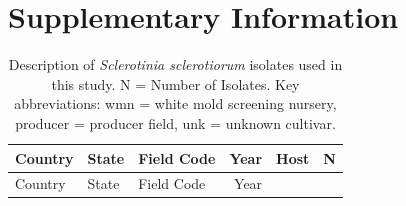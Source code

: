 \section*{Supplementary Information}\label{supplementary-information}

\setcounter{table}{0} \renewcommand{\thetable}{S\arabic{table}}
\setcounter{figure}{0} \renewcommand{\thefigure}{S\arabic{figure}}

\begin{longtable}[]{@{}lllrlr@{}}
\caption{\label{tab:isolate-table} Description of \emph{Sclerotinia
sclerotiorum} isolates used in this study. N = Number of Isolates. Key
abbreviations: wmn = white mold screening nursery, producer = producer
field, unk = unknown cultivar.}\tabularnewline
\toprule
\begin{minipage}[b]{0.11\columnwidth}\raggedright\strut
Country\strut
\end{minipage} & \begin{minipage}[b]{0.08\columnwidth}\raggedright\strut
State\strut
\end{minipage} & \begin{minipage}[b]{0.12\columnwidth}\raggedright\strut
Field Code\strut
\end{minipage} & \begin{minipage}[b]{0.19\columnwidth}\raggedleft\strut
Year\strut
\end{minipage} & \begin{minipage}[b]{0.29\columnwidth}\raggedright\strut
Host\strut
\end{minipage} & \begin{minipage}[b]{0.04\columnwidth}\raggedleft\strut
N\strut
\end{minipage}\tabularnewline
\midrule
\endfirsthead
\toprule
\begin{minipage}[b]{0.11\columnwidth}\raggedright\strut
Country\strut
\end{minipage} & \begin{minipage}[b]{0.08\columnwidth}\raggedright\strut
State\strut
\end{minipage} & \begin{minipage}[b]{0.12\columnwidth}\raggedright\strut
Field Code\strut
\end{minipage} & \begin{minipage}[b]{0.19\columnwidth}\raggedleft\strut
Year\strut
\end{minipage} & \begin{minipage}[b]{0.29\columnwidth}\raggedright\strut

\end{minipage}
\end{longtable}
